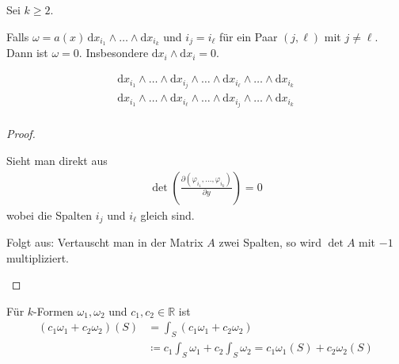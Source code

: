 \begin{notice}[Eigenschaften:] \label{thm:12.7}
  Sei $k \geq 2$.
  \begin{enum-arab}
    \item Falls $\omega = a(x) \, \mathrm{d}x_{i_1} \wedge \ldots \wedge \mathrm{d}x_{i_k}$ und $i_j = i_\ell$ für ein Paar $(j,\ell)$ mit $j \neq \ell$. Dann ist $\omega = 0$. Insbesondere $\mathrm{d}x_i \wedge \mathrm{d}x_i = 0$.
    
    \item
    \begin{gather*}
      \mathrm{d}x_{i_1} \wedge \ldots \wedge \mathrm{d}x_{i_j} \wedge \ldots \wedge \mathrm{d}x_{i_\ell} \wedge \ldots \wedge \mathrm{d}x_{i_k} \\
      \mathrm{d}x_{i_1} \wedge \ldots \wedge \mathrm{d}x_{i_\ell} \wedge \ldots \wedge \mathrm{d}x_{i_j} \wedge \ldots \wedge \mathrm{d}x_{i_k} \\
    \end{gather*}
  \end{enum-arab}
  
  \begin{proof}
    \begin{enum-arab}
      \item Sieht man direkt aus
      \begin{align*}
        \det \left( \frac{\partial (\varphi_{i_1} ,\ldots, \varphi_{i_k})}{\partial y} \right) = 0
      \end{align*}
      wobei die Spalten $i_j$ und $i_\ell$ gleich sind.
      
      \item Folgt aus: Vertauscht man in der Matrix $A$ zwei Spalten, so wird $\det A$ mit $-1$ multipliziert.
    \end{enum-arab}
  \end{proof}
\end{notice}

\begin{notice} \label{thm:12.8}
  Für $k$-Formen $\omega_1,\omega_2$ und $c_1, c_2 \in \mathbb{R}$ ist
  \begin{align*}
    (c_1 \omega_1 + c_2 \omega_2)(S)
    &= \int_S (c_1 \omega_1 + c_2 \omega_2) \\
    &\coloneq c_1 \int_S \omega_1 + c_2 \int_S \omega_2 = c_1 \omega_1(S) + c_2 \omega_2(S)
  \end{align*}
\end{notice}

